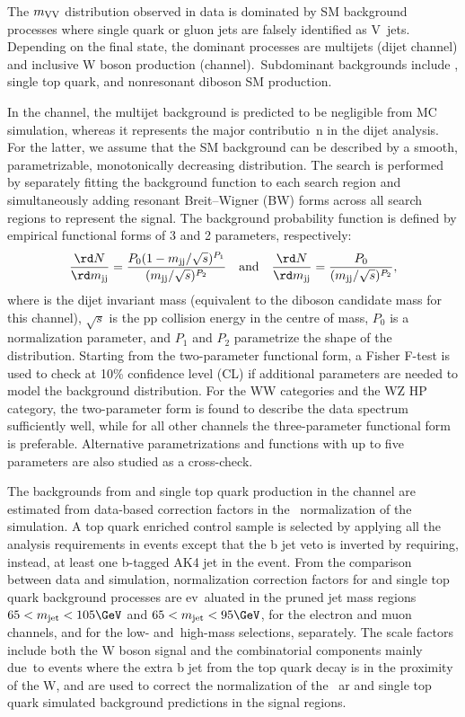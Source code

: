 The $m_{\mathrm{V}\mathrm{V}}$ distribution observed in data is dominated by SM background processes where single quark or gluon jets are falsely identified as V\
 jets. Depending on the final state, the dominant processes are multijets (dijet channel) and inclusive W boson production (\lnujet channel).\
 Subdominant backgrounds include \ttbar, single top quark, and nonresonant diboson SM production.

In the \lnujet channel, the multijet background is predicted to be negligible from MC simulation, whereas it represents the major contributio\
n in the dijet analysis.
For the latter, we assume that the SM background can be described by a smooth, parametrizable, monotonically decreasing distribution.
The search is performed by separately fitting the background function to each search region
and simultaneously adding resonant Breit--Wigner (BW) forms across all search regions to represent the signal.
The background probability function is defined by empirical functional forms of 3 and 2 parameters, respectively:
\begin{align}
\label{eq:dijet1}
\frac{\rd N}{\rd\mjj}= \frac{ P_0(1-\mjj/\sqrt{s})^{P_1} } { (\mjj/\sqrt{s})^{P_2} }&&\text{and}
&&
\frac{\rd N}{\rd\mjj}= \frac{ P_0 } { (\mjj/\sqrt{s})^{P_2} },
\end{align}
where
\mjj{} is the dijet invariant mass (equivalent to the diboson candidate mass \mVV{} for this channel),
$\sqrt{s}$ is the pp collision energy in the centre of mass,
$P_0$ is a normalization parameter,
and $P_1$ and $P_2$ parametrize the shape of the \mVV{} distribution.
Starting from the two-parameter functional form, a Fisher F-test is used to check at 10\% confidence level (CL)
if additional parameters are needed to model the background distribution. For the WW
categories and the WZ HP category, the two-parameter form is found to describe the data
spectrum sufficiently well, while for all other channels the three-parameter functional form is preferable.
Alternative parametrizations and functions with up to five parameters are also studied as a cross-check.

The backgrounds from \ttbar and single top quark production in the \lnujet{} channel are estimated from data-based correction factors in the \
normalization of the simulation.
A top quark enriched control sample is selected by applying all the analysis requirements in \lnujet{} events
except that the b jet veto is inverted by requiring, instead, at least one b-tagged AK4 jet in the event.
From the comparison between data and simulation, normalization correction factors for \ttbar and single top quark background processes are ev\
aluated in the pruned jet mass regions $65 < \mJ < 105\GeV$ and $65 < \mJ < 95\GeV$, for the electron and muon channels, and for the low- and\
 high-mass selections, separately.
The scale factors include both the W boson signal and the combinatorial components mainly due\
 to events where the extra b jet from the top quark decay is in the proximity of the W, and are used to correct the normalization of the \ttb\
ar and single top quark simulated background predictions in the signal regions.

